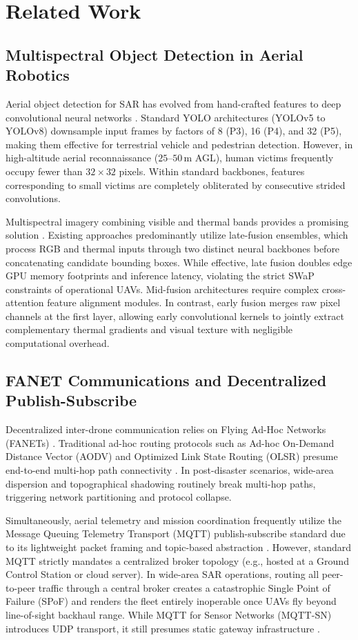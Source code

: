 \documentclass[conference]{IEEEtran}
\begin{document}
\section{Related Work}

\subsection{Multispectral Object Detection in Aerial Robotics}
Aerial object detection for SAR has evolved from hand-crafted features to deep convolutional neural networks \cite{ref2, ref13}. Standard YOLO architectures (YOLOv5 to YOLOv8) downsample input frames by factors of 8 (P3), 16 (P4), and 32 (P5), making them effective for terrestrial vehicle and pedestrian detection. However, in high-altitude aerial reconnaissance ($25\text{--}50\,\text{m}$ AGL), human victims frequently occupy fewer than $32 \times 32$ pixels. Within standard backbones, features corresponding to small victims are completely obliterated by consecutive strided convolutions.

Multispectral imagery combining visible and thermal bands provides a promising solution \cite{ref3}. Existing approaches predominantly utilize late-fusion ensembles, which process RGB and thermal inputs through two distinct neural backbones before concatenating candidate bounding boxes. While effective, late fusion doubles edge GPU memory footprints and inference latency, violating the strict SWaP constraints of operational UAVs. Mid-fusion architectures require complex cross-attention feature alignment modules. In contrast, early fusion merges raw pixel channels at the first layer, allowing early convolutional kernels to jointly extract complementary thermal gradients and visual texture with negligible computational overhead.

\subsection{FANET Communications and Decentralized Publish-Subscribe}
Decentralized inter-drone communication relies on Flying Ad-Hoc Networks (FANETs) \cite{ref11}. Traditional ad-hoc routing protocols such as Ad-hoc On-Demand Distance Vector (AODV) and Optimized Link State Routing (OLSR) presume end-to-end multi-hop path connectivity \cite{ref12}. In post-disaster scenarios, wide-area dispersion and topographical shadowing routinely break multi-hop paths, triggering network partitioning and protocol collapse.

Simultaneously, aerial telemetry and mission coordination frequently utilize the Message Queuing Telemetry Transport (MQTT) publish-subscribe standard due to its lightweight packet framing and topic-based abstraction \cite{ref21}. However, standard MQTT strictly mandates a centralized broker topology (e.g., hosted at a Ground Control Station or cloud server). In wide-area SAR operations, routing all peer-to-peer traffic through a central broker creates a catastrophic Single Point of Failure (SPoF) and renders the fleet entirely inoperable once UAVs fly beyond line-of-sight backhaul range. While MQTT for Sensor Networks (MQTT-SN) introduces UDP transport, it still presumes static gateway infrastructure \cite{ref21}.
\end{document}
